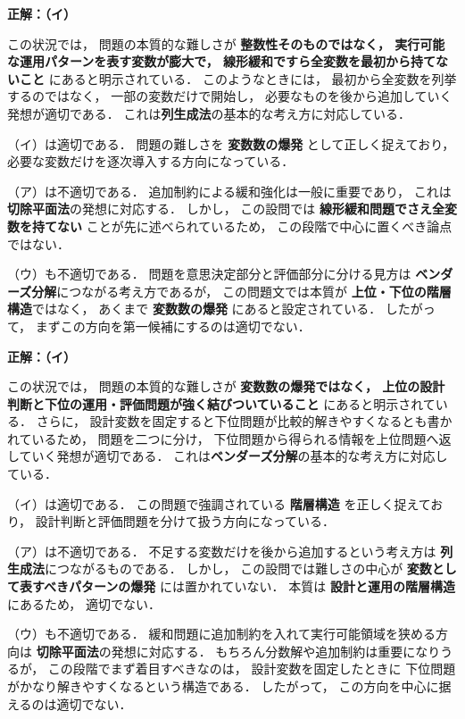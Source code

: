 \begin{example}[title={クイズ5 正解・解説}]
\label{ans:strict-cg-one}
\textbf{正解：（イ）}

この状況では，
問題の本質的な難しさが
\textbf{整数性そのものではなく，
実行可能な運用パターンを表す変数が膨大で，
線形緩和ですら全変数を最初から持てないこと}
にあると明示されている．
このようなときには，
最初から全変数を列挙するのではなく，
一部の変数だけで開始し，
必要なものを後から追加していく発想が適切である．
これは\textbf{列生成法}の基本的な考え方に対応している．

（イ）は適切である．
問題の難しさを
\textbf{変数数の爆発}
として正しく捉えており，
必要な変数だけを逐次導入する方向になっている．

（ア）は不適切である．
追加制約による緩和強化は一般に重要であり，
これは\textbf{切除平面法}の発想に対応する．
しかし，
この設問では
\textbf{線形緩和問題でさえ全変数を持てない}
ことが先に述べられているため，
この段階で中心に置くべき論点ではない．

（ウ）も不適切である．
問題を意思決定部分と評価部分に分ける見方は
\textbf{ベンダーズ分解}につながる考え方であるが，
この問題文では本質が
\textbf{上位・下位の階層構造}ではなく，
あくまで
\textbf{変数数の爆発}
にあると設定されている．
したがって，
まずこの方向を第一候補にするのは適切でない．

\end{example}

\begin{example}[title={クイズ6 正解・解説}]
\label{ans:strict-bd-one}
\textbf{正解：（イ）}

この状況では，
問題の本質的な難しさが
\textbf{変数数の爆発ではなく，
上位の設計判断と下位の運用・評価問題が強く結びついていること}
にあると明示されている．
さらに，
設計変数を固定すると下位問題が比較的解きやすくなるとも書かれているため，
問題を二つに分け，
下位問題から得られる情報を上位問題へ返していく発想が適切である．
これは\textbf{ベンダーズ分解}の基本的な考え方に対応している．

（イ）は適切である．
この問題で強調されている
\textbf{階層構造}
を正しく捉えており，
設計判断と評価問題を分けて扱う方向になっている．

（ア）は不適切である．
不足する変数だけを後から追加するという考え方は
\textbf{列生成法}につながるものである．
しかし，
この設問では難しさの中心が
\textbf{変数として表すべきパターンの爆発}
には置かれていない．
本質は
\textbf{設計と運用の階層構造}
にあるため，
適切でない．

（ウ）も不適切である．
緩和問題に追加制約を入れて実行可能領域を狭める方向は
\textbf{切除平面法}の発想に対応する．
もちろん分数解や追加制約は重要になりうるが，
この段階でまず着目すべきなのは，
設計変数を固定したときに
下位問題がかなり解きやすくなるという構造である．
したがって，
この方向を中心に据えるのは適切でない．

\end{example}



